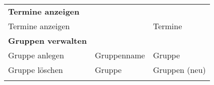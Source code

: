 \documentclass[]{article}
\begin{document}
\begin{longtable}[]{@{}lll@{}}
\begin{minipage}[t]{0.40\columnwidth}\raggedright
\textbf{Termine anzeigen}\strut
\end{minipage} & \begin{minipage}[t]{0.27\columnwidth}\raggedright
\strut
\end{minipage} & \begin{minipage}[t]{0.24\columnwidth}\raggedright
\strut
\end{minipage}\tabularnewline
\begin{minipage}[t]{0.40\columnwidth}\raggedright
Termine anzeigen\strut
\end{minipage} & \begin{minipage}[t]{0.27\columnwidth}\raggedright
\strut
\end{minipage} & \begin{minipage}[t]{0.24\columnwidth}\raggedright
Termine\strut
\end{minipage}\tabularnewline
\begin{minipage}[t]{0.40\columnwidth}\raggedright
\textbf{Gruppen verwalten}\strut
\end{minipage} & \begin{minipage}[t]{0.27\columnwidth}\raggedright
\strut
\end{minipage} & \begin{minipage}[t]{0.24\columnwidth}\raggedright
\strut
\end{minipage}\tabularnewline
\begin{minipage}[t]{0.40\columnwidth}\raggedright
Gruppe anlegen\strut
\end{minipage} & \begin{minipage}[t]{0.27\columnwidth}\raggedright
Gruppenname\strut
\end{minipage} & \begin{minipage}[t]{0.24\columnwidth}\raggedright
Gruppe\strut
\end{minipage}\tabularnewline
\begin{minipage}[t]{0.40\columnwidth}\raggedright
Gruppe löschen\strut
\end{minipage} & \begin{minipage}[t]{0.27\columnwidth}\raggedright
Gruppe\strut
\end{minipage} & \begin{minipage}[t]{0.24\columnwidth}\raggedright
Gruppen (neu)\strut
\end{minipage}\tabularnewline
\begin{minipage}[t]{0.40\columnwidth}\raggedright

\end{minipage}
\end{longtable}
\end{document}
